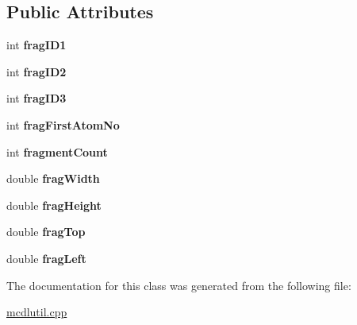 \subsection*{Public Attributes}
\begin{DoxyCompactItemize}
\item 
\hypertarget{class_open_babel_1_1_part_fragment_definition_afcfb48fbf24a83709c8bfb3d748ce684}{int {\bfseries frag\-I\-D1}}\label{class_open_babel_1_1_part_fragment_definition_afcfb48fbf24a83709c8bfb3d748ce684}

\item 
\hypertarget{class_open_babel_1_1_part_fragment_definition_aa03fa10baba4ae3e1f78eb296873732d}{int {\bfseries frag\-I\-D2}}\label{class_open_babel_1_1_part_fragment_definition_aa03fa10baba4ae3e1f78eb296873732d}

\item 
\hypertarget{class_open_babel_1_1_part_fragment_definition_a276f225c4609ddfc6a06e829c74a0b31}{int {\bfseries frag\-I\-D3}}\label{class_open_babel_1_1_part_fragment_definition_a276f225c4609ddfc6a06e829c74a0b31}

\item 
\hypertarget{class_open_babel_1_1_part_fragment_definition_a2bac8d52f7f59680c8b54713d0f6e632}{int {\bfseries frag\-First\-Atom\-No}}\label{class_open_babel_1_1_part_fragment_definition_a2bac8d52f7f59680c8b54713d0f6e632}

\item 
\hypertarget{class_open_babel_1_1_part_fragment_definition_a159ebf5351d4cc17149640d3f64b0960}{int {\bfseries fragment\-Count}}\label{class_open_babel_1_1_part_fragment_definition_a159ebf5351d4cc17149640d3f64b0960}

\item 
\hypertarget{class_open_babel_1_1_part_fragment_definition_a661bcb1322120fcbecb5ecfbcfa9375b}{double {\bfseries frag\-Width}}\label{class_open_babel_1_1_part_fragment_definition_a661bcb1322120fcbecb5ecfbcfa9375b}

\item 
\hypertarget{class_open_babel_1_1_part_fragment_definition_a3fee2268575310b1dfb8e11165d81fa7}{double {\bfseries frag\-Height}}\label{class_open_babel_1_1_part_fragment_definition_a3fee2268575310b1dfb8e11165d81fa7}

\item 
\hypertarget{class_open_babel_1_1_part_fragment_definition_af38c3efea96acad96c678fd8afc8ffd0}{double {\bfseries frag\-Top}}\label{class_open_babel_1_1_part_fragment_definition_af38c3efea96acad96c678fd8afc8ffd0}

\item 
\hypertarget{class_open_babel_1_1_part_fragment_definition_a7588973d97b05ffb08a903a060b0934a}{double {\bfseries frag\-Left}}\label{class_open_babel_1_1_part_fragment_definition_a7588973d97b05ffb08a903a060b0934a}

\end{DoxyCompactItemize}


The documentation for this class was generated from the following file\-:\begin{DoxyCompactItemize}
\item 
\hyperlink{mcdlutil_8cpp}{mcdlutil.\-cpp}\end{DoxyCompactItemize}
